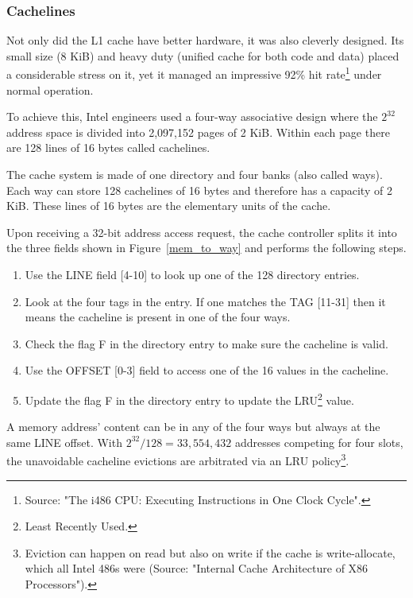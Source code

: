 \subsubsection{Cachelines}
Not only did the L1 cache have better hardware, it was also cleverly designed. Its small size (8 KiB) and heavy duty (unified cache for both code and data) placed a considerable stress on it, yet it managed an impressive 92\% hit rate\footnote{Source: "The i486 CPU: Executing Instructions in One Clock Cycle".} under normal operation.\\
\par
To achieve this, Intel engineers used a four-way associative design where the $2^{32}$ address space is divided into 2,097,152 pages of 2 KiB. Within each page there are 128 lines of 16 bytes called cachelines.\\
\par
{}
\par
The cache system is made of one directory and four banks (also called ways). Each way can store 128 cachelines of 16 bytes and therefore has a capacity of 2 KiB. These lines of 16 bytes are the elementary units of the cache.\\
\par
Upon receiving a 32-bit address access request, the cache controller splits it into the three fields shown in Figure~\ref{mem_to_way} and performs the following steps.
\begin{enumerate}
\item Use the LINE field [4-10] to look up one of the 128 directory entries.
\item Look at the four tags in the entry. If one matches the TAG [11-31] then it means the cacheline is present in one of the four ways.
\item Check the flag F in the directory entry to make sure the cacheline is valid.
\item Use the OFFSET [0-3] field to access one of the 16 values in the cacheline.
\item Update the flag F in the directory entry to update the LRU\footnote{Least Recently Used.}  value.
\end{enumerate}
\par
A memory address' content can be in any of the four ways but always at the same LINE offset. With $2^{32} / 128 = 33,554,432$ addresses competing for four slots, the unavoidable cacheline evictions are arbitrated via an LRU policy\footnote{Eviction can happen on read but also on write if the cache is write-allocate, which all Intel 486s were (Source: "Internal Cache Architecture of X86 Processors").}.\\
